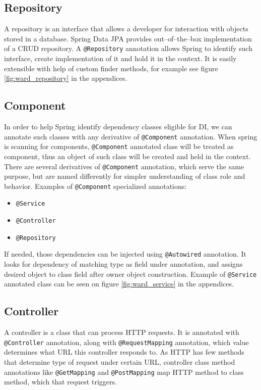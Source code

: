 \documentclass[a4paper,twoside,12pt]{book}
\begin{document}
    \subsection{Repository}
      A repository is an interface that allows a developer for interaction with objects stored in a database.
      Spring Data JPA provides out--of--the--box implementation of a CRUD repository.
      A \lstinline|@Repository| annotation allows Spring to identify such interface, create implementation of it and hold it in the context.
      It is easily extensible with help of custom finder methods, for example see figure \ref{fig:ward_repository} in the appendices.

    \subsection{Component}
      In order to help Spring identify dependency classes eligible for DI, we can annotate such classes with any derivative of \lstinline|@Component| annotation.
      When spring is scanning for components, \lstinline|@Component| annotated class will be treated as component, thus an object of such class will be created and held in the context.
      There are several derivatives of \lstinline|@Component| annotation, which serve the same purpose, but are named differently for simpler understanding of class role and behavior.
      Examples of \lstinline|@Component| specialized annotations:
      \begin{itemize}
        \item \lstinline|@Service|
        \item \lstinline|@Controller|
        \item \lstinline|@Repository|
      \end{itemize}
      If needed, those dependencies can be injected using \lstinline|@Autowired| annotation.
      It looks for dependency of matching type as field under annotation, and assigns desired object to class field after owner object construction.
      Example of \lstinline|@Service| annotated class can be seen on figure \ref{fig:ward_service} in the appendices.

    \subsection{Controller}
      A controller is a class that can process HTTP requests. It is annotated with \lstinline|@Controller| annotation, along with \lstinline|@RequestMapping| annotation, 
      which value determines what URL this controller responds to.
      As HTTP has few methods that determine type of request under certain URL, controller class method annotations like \lstinline|@GetMapping| and \lstinline|@PostMapping|
      map HTTP method to class method, which that request triggers.
\end{document}
